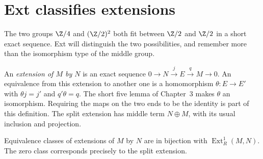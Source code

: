 \section{Ext classifies extensions}

The two groups $\Z/4$ and $(\Z/2)^2$ both fit between $\Z/2$ and $\Z/2$ in a short exact sequence. Ext will distinguish the two possibilities, and remember more than the isomorphism type of the middle group.

An \emph{extension of $M$ by $N$} is an exact sequence
$0\to N\xrightarrow{j}E\xrightarrow{q}M\to0$.
An equivalence from this extension to another one is a homomorphism $\theta:E\to E'$ with $\theta j=j'$ and $q'\theta=q$. The short five lemma of Chapter~3 makes $\theta$ an isomorphism. Requiring the maps on the two ends to be the identity is part of this definition. The split extension has middle term $N\oplus M$, with its usual inclusion and projection.

\begin{theorem}\label{thm:extclass}
Equivalence classes of extensions of $M$ by $N$ are in bijection with
$\operatorname{Ext}^1_R(M,N)$. The zero class corresponds precisely to the split extension.
\end{theorem}

